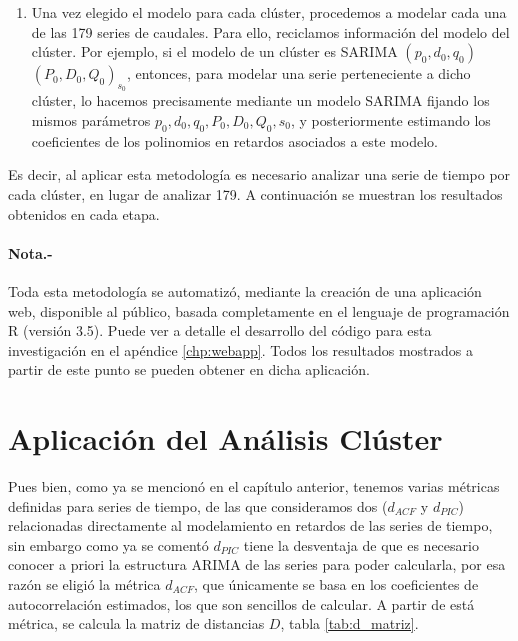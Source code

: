 \documentclass[12pt,oneside]{book}\usepackage[]{graphicx}\usepackage[]{color}
\theoremstyle{definition} %
\begin{document}
\begin{enumerate}
\begin{enumerate}
\end{enumerate}
\item Una vez elegido el modelo para cada clúster, procedemos a modelar cada una de las 179 series de caudales. Para ello, reciclamos información del modelo del clúster. Por ejemplo, si el modelo de un clúster	es SARIMA $(p_0,d_0,q_0)$ $(P_0,D_0,Q_0)_s_0$, entonces, para modelar una serie perteneciente a dicho clúster, lo hacemos precisamente mediante un modelo SARIMA fijando los mismos parámetros $p_0, d_0, q_0, P_0, D_0, Q_0, s_0$, y posteriormente estimando los coeficientes de los polinomios en retardos asociados a este modelo. 

\end{enumerate}

Es decir, al aplicar esta metodología es necesario analizar una serie de tiempo por cada clúster, en lugar de analizar 179. A continuación se muestran los resultados obtenidos en cada etapa.

\paragraph{Nota.-} Toda esta metodología se automatizó, mediante la creación de una aplicación web, disponible al público, basada completamente en el lenguaje de programación R (versión 3.5). Puede ver a detalle el desarrollo del código para esta investigación en el apéndice \ref{chp:webapp}. Todos los resultados mostrados a partir de este punto se pueden obtener en dicha aplicación.



\section{Aplicación del Análisis Clúster}


Pues bien, como ya se mencionó en el capítulo anterior, tenemos varias métricas definidas para series de tiempo, de las que consideramos dos ($d_{ACF}$ y $d_{PIC}$) relacionadas directamente al modelamiento en retardos de las series de tiempo, sin embargo como ya se comentó $d_{PIC}$ tiene la desventaja de que es necesario conocer a priori la estructura ARIMA de las series para poder calcularla, por esa razón se eligió la métrica $d_{ACF}$, que únicamente se basa en los coeficientes de autocorrelación estimados, los que son sencillos de calcular. A partir de está métrica, se calcula la matriz de distancias $D$, tabla \ref{tab:d_matriz}.
\end{document}
